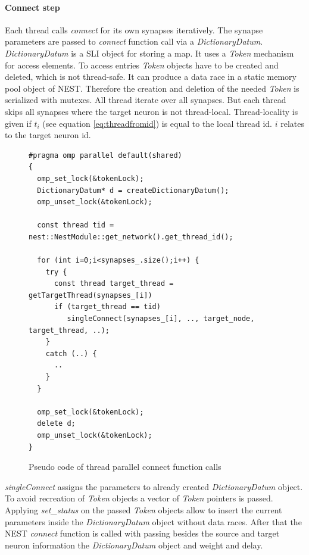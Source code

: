 \paragraph{Connect step}
Each thread calls \emph{connect} for its own synapses iteratively.
The synapse parameters are passed to \emph{connect} function call via a \emph{DictionaryDatum}.
\emph{DictionaryDatum} is a SLI object for storing a map.
It uses a \emph{Token} mechanism for access elements.
To access entries \emph{Token} objects have to be created and deleted,
which is not thread-safe. It can produce a data race in a static memory pool object of NEST.
Therefore the creation and deletion of the needed \emph{Token} is serialized with mutexes.
All thread iterate over all synapses.
But each thread skips all synapses where the target neuron is not thread-local.
Thread-locality is given if $t_i$ (see equation \ref{eq:threadfromid}) is equal to the local thread id.
$i$ relates to the target neuron id.
\begin{figure}[ht!]
\begin{lstlisting}[style=cppcode]
#pragma omp parallel default(shared)
{ 
  omp_set_lock(&tokenLock);
  DictionaryDatum* d = createDictionaryDatum();  
  omp_unset_lock(&tokenLock);

  const thread tid = nest::NestModule::get_network().get_thread_id();
      
  for (int i=0;i<synapses_.size();i++) {
    try {
      const thread target_thread = getTargetThread(synapses_[i])
      if (target_thread == tid)
	     singleConnect(synapses_[i], .., target_node, target_thread, ..);
    }
    catch (..) {
      ..
    }
  }
  
  omp_set_lock(&tokenLock);
  delete d;  
  omp_unset_lock(&tokenLock);
}
\end{lstlisting}
\caption{Pseudo code of thread parallel connect function calls}
\end{figure}
\emph{singleConnect} assigns the parameters to already created \emph{DictionaryDatum} object.
To avoid recreation of \emph{Token} objects a vector of  \emph{Token} pointers is
passed. Applying \emph{set\_{}status} on the passed \emph{Token} objects allow to
insert the current parameters inside the \emph{DictionaryDatum} object without data races.
After that the NEST \emph{connect} function is called with passing besides the source and target
neuron information the \emph{DictionaryDatum} object and weight and delay.
